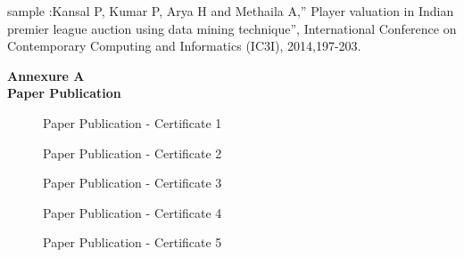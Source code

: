 \documentclass[12pt]{report}	%
\begin{document}
\clearpage
    \begin{figure}[h!]
    \begin{center}
    \end{center}
    \end{figure}

\clearpage




\newpage
{}
\renewcommand\bibname{References}

\begin{thebibliography}{1}


\bibitem{} sample :Kansal P, Kumar P, Arya H and Methaila A,” Player valuation in Indian premier league auction using data mining technique”, International Conference on Contemporary Computing and Informatics (IC3I), 2014,197-203.
\bibitem{}
\bibitem{}
\bibitem{}
\bibitem{}
\end{thebibliography}


\clearpage
{}
\begin{center}
    \textbf{Annexure A}\\
    \textbf{Paper Publication}
\end{center}
\begin{figure}[h!]
\begin{center}
        \caption{Paper Publication - Certificate 1}
\end{center}
\end{figure}
\begin{figure}[h!]
\begin{center}
 \caption{Paper Publication - Certificate 2}
\end{center}
\end{figure}
\begin{figure}[h!]
\begin{center}
 \caption{Paper Publication - Certificate 3}
\end{center}
\end{figure}
\begin{figure}[h!]
\begin{center}
 \caption{Paper Publication - Certificate 4}
\end{center}
\end{figure}
\begin{figure}[h!]
\begin{center}
 \caption{Paper Publication - Certificate 5}
\end{center}
\end{figure}
\end{document}
